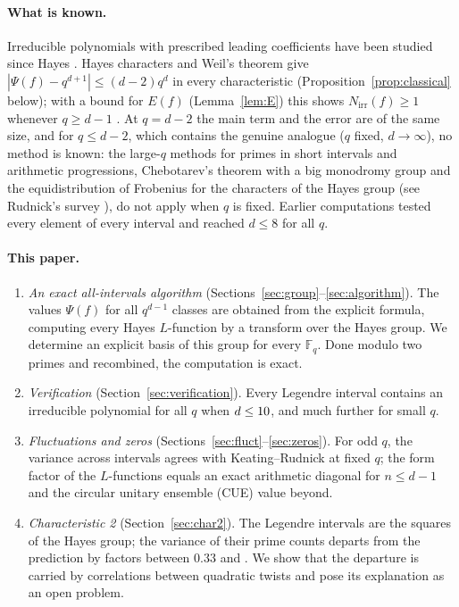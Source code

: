 \documentclass[11pt,a4paper]{article}
\theoremstyle{definition}
\theoremstyle{remark}
\newcommand{\Fq}{\mathbb{F}_q}
\newcommand{\Nirr}{N_{\mathrm{irr}}}
\begin{document}
\paragraph{What is known.} Irreducible polynomials with prescribed leading coefficients have
been studied since Hayes \cite{Hayes1965,Hsu1996,Wan1997,Cohen2005,Pollack2013,Ha2016,Gao2021}.
Hayes characters and Weil's theorem give $|\Psi(f)-q^{d+1}|\le(d-2)q^d$ in every characteristic
(Proposition~\ref{prop:classical} below); with a bound for $E(f)$ (Lemma~\ref{lem:E}) this shows
$\Nirr(f)\ge1$ whenever $q\ge d-1$ \cite{ChenV7}. At $q=d-2$
the main term and the error are of the same size, and for $q\le d-2$, which contains the
genuine analogue ($q$ fixed, $d\to\infty$), no method is known: the large-$q$ methods for
primes in short intervals and arithmetic progressions, Chebotarev's theorem with a big monodromy
group \cite{BBR2015} and the equidistribution of Frobenius for the characters of the Hayes group
\cite{KR2014,Katz2013} (see Rudnick's survey \cite{Rudnick2014}), do not apply when $q$ is fixed.
Earlier computations \cite{ChenV7} tested every element of every interval and reached $d\le8$ for all $q$.

\paragraph{This paper.}
\begin{enumerate}[label=(\arabic*),nosep]
\item \emph{An exact all-intervals algorithm} (Sections~\ref{sec:group}--\ref{sec:algorithm}).
      The values $\Psi(f)$ for all $q^{d-1}$ classes are obtained from the explicit formula,
      computing every Hayes $L$-function by a transform over the Hayes group. We determine an
      explicit basis of this group for every $\Fq$. Done modulo two primes and recombined, the
      computation is exact.
\item \emph{Verification} (Section~\ref{sec:verification}). Every Legendre interval contains an
      irreducible polynomial for all $q$ when $d\le10$, and much further for small $q$.
\item \emph{Fluctuations and zeros} (Sections~\ref{sec:fluct}--\ref{sec:zeros}). For odd $q$,
      the variance across intervals agrees with Keating--Rudnick \cite{KR2014} at fixed $q$; the
      form factor of the $L$-functions equals an exact arithmetic diagonal for $n\le d-1$ and the
      circular unitary ensemble (CUE) value beyond.
\item \emph{Characteristic 2} (Section~\ref{sec:char2}). The Legendre intervals are the squares
      of the Hayes group; the variance of their prime counts departs from the prediction by factors
      between $0.33$ and \MaxExcess. We show that the departure is carried by correlations between
      quadratic twists and pose its explanation as an open problem.
\end{enumerate}
\end{document}
